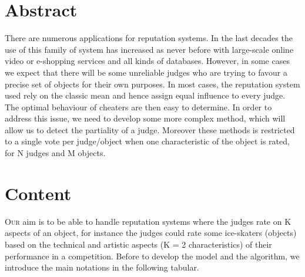 \documentclass[9pt]{SelfArx} %
\begin{document}
\flushbottom %

\maketitle %

\thispagestyle{empty} %


\section*{Abstract}
There are numerous applications for reputation systems. In the last decades the use of this family of system has increased as never before with large-scale online video or e-shopping services and all kinds of databases. However, in some cases we expect that there will be some unreliable judges who are trying to favour a precise set of objects for their own purposes. In most cases, the reputation system used rely on the classic mean and hence assign equal influence to every judge. The optimal behaviour of cheaters are then easy to determine. In order to address this issue, we need to develop some more complex method, which will allow us to detect the partiality of a judge. Moreover these methods is restricted to a single vote per judge/object when one characteristic of the object is rated, for N judges and M objects.

\section*{Content}

\lettrine[lines=2]{O}{ur} aim is to be able to handle reputation systems where the judges rate on K aspects of an object, for instance the judges could rate some ice-skaters (objects) based on the technical and artistic aspects (K = 2 characteristics) of their performance in a competition. Before to develop the model and the algorithm, we introduce the main notations in the following tabular.
\end{document}
